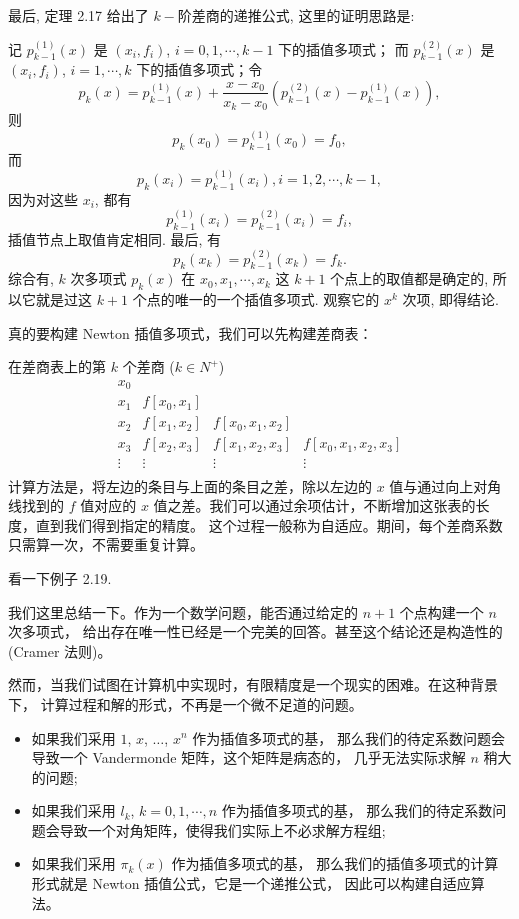 \documentclass[a4paper]{ctexart}
\begin{document}
最后, 定理 2.17 给出了 $k-$阶差商的递推公式, 这里的证明思路是:

记 $p_{k - 1}^{(1)}(x)$ 是 $(x_i, f_i)$, $i = 0, 1, \cdots, k - 1$ 下的插值多项式；
而 $p_{k - 1}^{(2)}(x)$ 是 $(x_i, f_i)$, $i = 1, \cdots, k$ 下的插值多项式；令
$$
p_k(x) = p_{k - 1}^{(1)}(x)
+ \frac{x - x_0}{x_k - x_0}\left(p_{k - 1}^{(2)}(x) - p_{k - 1}^{(1)}(x)\right),
$$
则
$$
p_k(x_0) = p_{k - 1}^{(1)}(x_0) = f_0,
$$
而
$$
p_k(x_i) = p_{k - 1}^{(1)}(x_i), i = 1, 2, \cdots, k - 1,
$$
因为对这些 $x_i$, 都有
$$
p_{k - 1}^{(1)}(x_i) = p_{k - 1}^{(2)}(x_i) = f_i,
$$
插值节点上取值肯定相同. 最后, 有
$$
p_k(x_k) = p_{k - 1}^{(2)}(x_k) = f_k.
$$
综合有, $k$ 次多项式 $p_k(x)$ 在 $x_0, x_1, \cdots, x_k$ 这 $k + 1$
个点上的取值都是确定的, 所以它就是过这 $k + 1$ 个点的唯一的一个插值多项式. 观察它的 $x^k$ 次项,
即得结论.

真的要构建 Newton 插值多项式，我们可以先构建差商表：

 在差商表上的第 $k$ 个差商 ($k \in N^+$) 
\[
\begin{array}{cccc}
x_0 & & & \\
x_1 & f [x_0, x_1] & & \\
x_2 & f [x_1, x_2] & f [x_0 , x_1, x_2] & \\
x_3 & f [x_2, x_3] & f [x_1 , x_2, x_3] & f [x_0 , x_1 , x_2 , x_3 ] \\
\vdots & \vdots & \vdots & \vdots \\
\end{array}
\]
计算方法是，将左边的条目与上面的条目之差，除以左边的 $x$ 值与通过向上对角线找到的 
$f$ 值对应的 $x$ 值之差。我们可以通过余项估计，不断增加这张表的长度，直到我们得到指定的精度。
这个过程一般称为自适应。期间，每个差商系数只需算一次，不需要重复计算。

看一下例子 2.19.

我们这里总结一下。作为一个数学问题，能否通过给定的 $n + 1$ 个点构建一个 $n$ 次多项式，
给出存在唯一性已经是一个完美的回答。甚至这个结论还是构造性的 (Cramer 法则)。

然而，当我们试图在计算机中实现时，有限精度是一个现实的困难。在这种背景下，
计算过程和解的形式，不再是一个微不足道的问题。

\begin{itemize}
  \item 如果我们采用 $1$, $x$, $\ldots$, $x^n$ 作为插值多项式的基，
  那么我们的待定系数问题会导致一个 Vandermonde 矩阵，这个矩阵是病态的，
  几乎无法实际求解 $n$ 稍大的问题;
  \item 如果我们采用 $l_k$, $k = 0, 1, \cdots, n$ 作为插值多项式的基，
  那么我们的待定系数问题会导致一个对角矩阵，使得我们实际上不必求解方程组;
  \item 如果我们采用 $\pi_k(x)$ 作为插值多项式的基，
  那么我们的插值多项式的计算形式就是 Newton 插值公式，它是一个递推公式，
  因此可以构建自适应算法。
\end{itemize}
\end{document}
